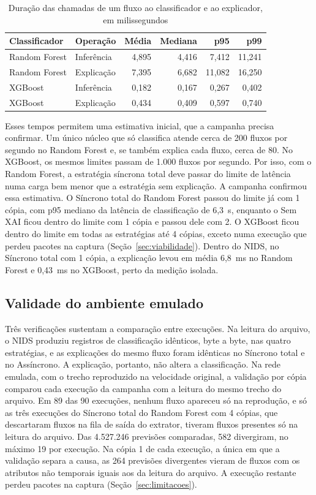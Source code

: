 \documentclass[
  article,
  12pt,
  oneside,
  a4paper,
  english,
  brazil
]{abntex2}
\begin{document}
\begin{table}[htbp]
  \centering
  \caption{Duração das chamadas de um fluxo ao classificador e ao explicador, em milissegundos}
  \label{tab:custo-isolado}
  \begin{tabular}{llrrrr}
    \toprule
    Classificador & Operação & Média & Mediana & p95 & p99 \\
    \midrule
    Random Forest & Inferência & 4,895 & 4,416 & 7,412 & 11,241 \\
    Random Forest & Explicação & 7,395 & 6,682 & 11,082 & 16,250 \\
    XGBoost & Inferência & 0,182 & 0,167 & 0,267 & 0,402 \\
    XGBoost & Explicação & 0,434 & 0,409 & 0,597 & 0,740 \\
    \bottomrule
  \end{tabular}
\end{table}

Esses tempos permitem uma estimativa inicial, que a campanha precisa confirmar. Um único núcleo que
só classifica atende cerca de 200 fluxos por segundo no Random Forest e, se também explica cada
fluxo, cerca de 80. No XGBoost, os mesmos limites passam de 1.000 fluxos por segundo. Por isso, com
o Random Forest, a estratégia síncrona total deve passar do limite de latência numa carga bem menor
que a estratégia sem explicação. A campanha confirmou essa estimativa. O Síncrono total do Random
Forest passou do limite já com 1 cópia, com p95 mediano da latência de classificação de 6,3~s,
enquanto o Sem XAI ficou dentro do limite com 1 cópia e passou dele com 2. O XGBoost ficou dentro do
limite em todas as estratégias até 4 cópias, exceto numa execução que perdeu pacotes na captura
(Seção~\ref{sec:viabilidade}). Dentro do NIDS, no Síncrono total com 1 cópia, a explicação levou em
média 6,8~ms no Random Forest e 0,43~ms no XGBoost, perto da medição isolada.

\subsection{Validade do ambiente emulado}
\label{sec:validade}

Três verificações sustentam a comparação entre execuções. Na leitura do arquivo, o NIDS produziu
registros de classificação idênticos, byte a byte, nas quatro estratégias, e as explicações do mesmo
fluxo foram idênticas no Síncrono total e no Assíncrono. A explicação, portanto, não altera a
classificação. Na rede emulada, com o trecho reproduzido na velocidade original, a validação por
cópia comparou cada execução da campanha com a leitura do mesmo trecho do arquivo. Em 89 das 90
execuções, nenhum fluxo apareceu só na reprodução, e só as três execuções do Síncrono total do Random
Forest com 4 cópias, que descartaram fluxos na fila de saída do extrator, tiveram fluxos presentes só
na leitura do arquivo. Das 4.527.246 previsões comparadas, 582 divergiram, no máximo 19 por execução.
Na cópia 1 de cada execução, a única em que a validação separa a causa, as 264 previsões divergentes
vieram de fluxos com os atributos não temporais iguais aos da leitura do arquivo. A execução restante
perdeu pacotes na captura (Seção~\ref{sec:limitacoes}).
\end{document}

